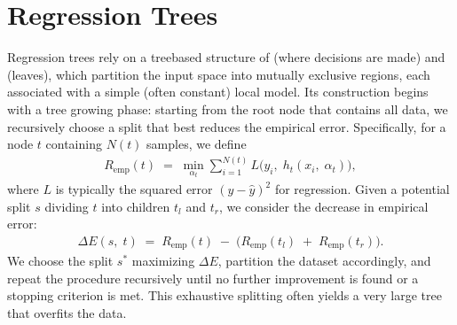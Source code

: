 \documentclass[letterpaper,10pt,english]{jupyterBook}
\begin{document}
\section{Regression Trees}
\label{\detokenize{03:regression-trees}}
\sphinxAtStartPar
Regression trees rely on a tree\sphinxhyphen{}based structure of  (where decisions are made) and  (leaves), which partition the input space into mutually exclusive regions, each associated with a simple (often constant) local model. Its construction begins with a tree growing phase: starting from the root node that contains all data, we recursively choose a split that best reduces the empirical error. Specifically, for a node \(t\) containing \(N(t)\) samples, we define
\begin{equation*}
\begin{split}
R_{\mathrm{emp}}(t) \;=\; \min_{\alpha_t} \sum_{i=1}^{N(t)} L\bigl(y_i,\;h_t(x_i,\;\alpha_t)\bigr),
\end{split}
\end{equation*}
\sphinxAtStartPar
where \(L\) is typically the squared error \((y - \hat{y})^2\) for regression. Given a potential split \(s\) dividing \(t\) into children \(t_l\) and \(t_r\), we consider the decrease in empirical error:
\begin{equation*}
\begin{split}
\Delta E(s,\;t) \;=\; R_{\mathrm{emp}}(t)\;-\;\bigl(R_{\mathrm{emp}}(t_l)\;+\;R_{\mathrm{emp}}(t_r)\bigr).
\end{split}
\end{equation*}
\sphinxAtStartPar
We choose the split \(s^*\) maximizing \(\Delta E\), partition the dataset accordingly, and repeat the procedure recursively until no further improvement is found or a stopping criterion is met. This exhaustive splitting often yields a very large tree that overfits the data.
\end{document}
